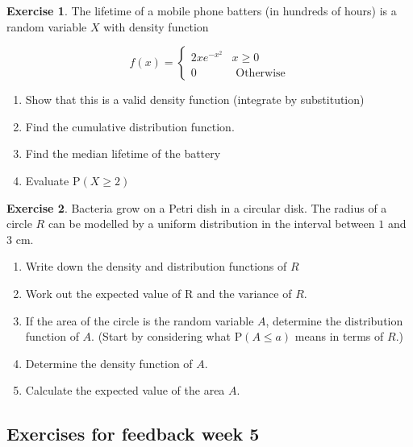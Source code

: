 \documentclass[
]{book}
\theoremstyle{definition}
\theoremstyle{definition}
\theoremstyle{definition}
\newtheorem{exercise}{Exercise}[chapter]
\theoremstyle{definition}
\theoremstyle{remark}
\begin{document}
\begin{exercise}

The lifetime of a mobile phone batters (in hundreds of hours) is a random variable \(X\) with density function

\begin{equation*}
  f(x)=\begin{cases}
        2xe^{-x^2} &  x \geq 0 \\
        0 &  \text{     Otherwise}
  \end{cases}
\end{equation*}

\begin{enumerate}
\def\labelenumi{\alph{enumi})}
\item
  Show that this is a valid density function (integrate by substitution)
\item
  Find the cumulative distribution function.
\item
  Find the median lifetime of the battery
\item
  Evaluate \(\text{P}(X\geq 2)\)
\end{enumerate}

\end{exercise}

\begin{exercise}

Bacteria grow on a Petri dish in a circular disk. The radius of a circle \(R\) can be modelled by a uniform distribution in the interval between \(1\) and \(3\) cm.

\begin{enumerate}
\def\labelenumi{\alph{enumi})}
\item
  Write down the density and distribution functions of \(R\)
\item
  Work out the expected value of R and the variance of \(R\).
\item
  If the area of the circle is the random variable \(A\), determine the distribution function of \(A\).
  (Start by considering what \(\text{P}(A\leq a)\) means in terms of \(R\).)
\item
  Determine the density function of \(A\).
\item
  Calculate the expected value of the area \(A\).
\end{enumerate}

\end{exercise}

\hypertarget{exercises-for-feedback-week-5}{%
\subsection{Exercises for feedback week 5}\label{exercises-for-feedback-week-5}}
\end{document}

